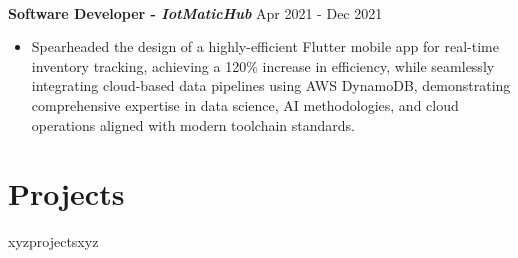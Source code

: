 \documentclass[a4paper,10pt]{article}
\begin{document}
\vspace{-8pt}
\textbf{\\ Software Developer - \textit{IotMaticHub}}  
\hfill Apr 2021 - Dec 2021
\begin{itemize}
\item Spearheaded the design of a highly-efficient Flutter mobile app for real-time inventory tracking, achieving a 120\% increase in efficiency, while seamlessly integrating cloud-based data pipelines using AWS DynamoDB, demonstrating comprehensive expertise in data science, AI methodologies, and cloud operations aligned with modern toolchain standards.
\end{itemize}

\vspace{-10pt}
\section*{Projects}
\vspace{-3pt}
xyzprojectsxyz
\end{document}
